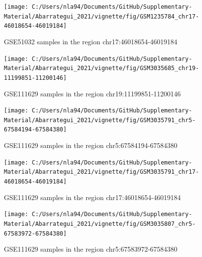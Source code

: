 \documentclass[
]{article}
\begin{document}
\begin{figure}[H]

{\centering \texttt{[image: C:/Users/nla94/Documents/GitHub/Supplementary-Material/Abarrategui\_2021/vignette/fig/GSM1235784\_chr17-46018654-46019184]} 

}

\caption{GSE51032 samples in the region chr17:46018654-46019184}\label{fig:graph_GSM1235784}
\end{figure}

\begin{figure}[H]

{\centering \texttt{[image: C:/Users/nla94/Documents/GitHub/Supplementary-Material/Abarrategui\_2021/vignette/fig/GSM3035685\_chr19-11199851-11200146]} 

}

\caption{GSE111629 samples in the region chr19:11199851-11200146}\label{fig:graph_GSM3035685}
\end{figure}

\begin{figure}[H]

{\centering \texttt{[image: C:/Users/nla94/Documents/GitHub/Supplementary-Material/Abarrategui\_2021/vignette/fig/GSM3035791\_chr5-67584194-67584380]} 

}

\caption{GSE111629 samples in the region chr5:67584194-67584380}\label{fig:graph_GSM3035791}
\end{figure}

\begin{figure}[H]

{\centering \texttt{[image: C:/Users/nla94/Documents/GitHub/Supplementary-Material/Abarrategui\_2021/vignette/fig/GSM3035791\_chr17-46018654-46019184]} 

}

\caption{GSE111629 samples in the region chr17:46018654-46019184}\label{fig:graph_GSM3035791.2}
\end{figure}

\begin{figure}[H]

{\centering \texttt{[image: C:/Users/nla94/Documents/GitHub/Supplementary-Material/Abarrategui\_2021/vignette/fig/GSM3035807\_chr5-67583972-67584380]} 

}

\caption{GSE111629 samples in the region chr5:67583972-67584380}\label{fig:graph_GSM3035807}
\end{figure}
\end{document}
